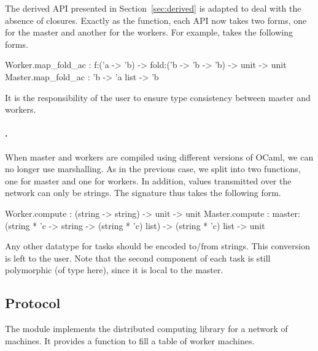 \documentclass[tfpsymp,pagenumbers]{tfp07symp}
\newcommand{\Ocaml}{OCaml}
\begin{document}
  The derived API presented in Section~\ref{sec:derived} is adapted to
  deal with the absence of closures. Exactly as the 
  function, each API now takes two forms, one for the master and
  another for the workers. For example,  takes the
  following forms.
  \begin{ocaml}
    Worker.map_fold_ac : f:('a -> 'b) -> fold:('b -> 'b -> 'b) -> unit
    -> unit Master.map_fold_ac : 'b -> 'a list -> 'b
  \end{ocaml}
  It is the responsibility of the user to ensure type consistency
  between master and workers.

  \paragraph{.} When master and workers are compiled using
  different versions of \Ocaml, we can no longer use marshalling.  As
  in the previous case, we split  into two functions, one
  for master and one for workers. In addition, values transmitted over
  the network can only be strings. The signature thus takes the
  following form.
  \begin{ocaml}
    Worker.compute : (string -> string) -> unit -> unit Master.compute
    : master:(string * 'c -> string -> (string * 'c) list) -> (string
    * 'c) list -> unit
  \end{ocaml}
  Any other datatype for tasks should be encoded to/from strings. This
  conversion is left to the user.  Note that the second component of
  each task is still polymorphic (of type  here), since it is
  local to the master.



\subsection{Protocol}\label{sec:protocol}

The  module implements the distributed computing library
for a network of machines. 
It provides a function
 to fill a table of
worker machines. 
\end{document}
